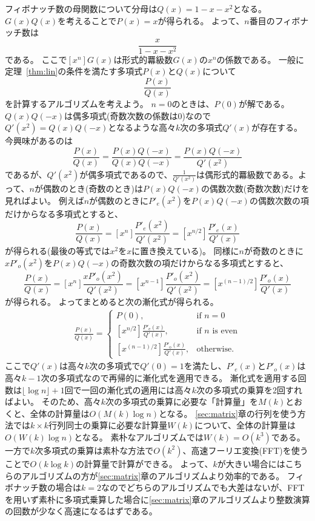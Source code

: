 \documentclass[a4paper,twoside,onecolumn,openany,article]{memoir}
\theoremstyle{plain}
\theoremstyle{remark}
\begin{document}
フィボナッチ数の母関数について分母は$Q(x)=1-x-x^2$となる。$G(x)Q(x)$を考えることで$P(x)=x$が得られる。
よって、$n$番目のフィボナッチ数は
\begin{equation*}
[x^n] \frac{x}{1-x-x^2}
\end{equation*}
である。
ここで$[x^n]G(x)$は形式的羃級数$G(x)$の$x^n$の係数である。
一般に定理~\ref{thm:lin}の条件を満たす多項式$P(x)$と$Q(x)$について
\begin{equation*}
[x^n]\frac{P(x)}{Q(x)}
\end{equation*}
を計算するアルゴリズムを考えよう。
$n=0$のときは、$P(0)$が解である。
$Q(x)Q(-x)$は偶多項式(奇数次数の係数は0)なので$Q'(x^2)=Q(x)Q(-x)$となるような高々$k$次の多項式$Q'(x)$が存在する。
今興味があるのは
\begin{equation*}
\frac{P(x)}{Q(x)} = \frac{P(x)Q(-x)}{Q(x)Q(-x)}
= \frac{P(x)Q(-x)}{Q'(x^2)}
\end{equation*}
であるが、$Q'(x^2)$が偶多項式であるので、$\frac1{Q'(x^2)}$は偶形式的羃級数である。よって、$n$が偶数のとき(奇数のとき)は$P(x)Q(-x)$の偶数次数(奇数次数)だけを見ればよい。
例えば$n$が偶数のときに$P'_e(x^2)$を$P(x)Q(-x)$の偶数次数の項だけからなる多項式とすると、
\begin{equation*}
[x^n]\frac{P(x)}{Q(x)} = [x^n]\frac{P'_e(x^2)}{Q'(x^2)}
= [x^{n/2}]\frac{P'_e(x)}{Q'(x)}
\end{equation*}
が得られる(最後の等式では$x^2$を$x$に置き換えている)。
同様に$n$が奇数のときに$xP'_o(x^2)$を$P(x)Q(-x)$の奇数次数の項だけからなる多項式とすると、
\begin{equation*}
[x^n]\frac{P(x)}{Q(x)} = [x^n]\frac{xP'_o(x^2)}{Q'(x^2)}
= [x^{n-1}]\frac{P'_o(x^2)}{Q'(x^2)} = [x^{(n-1)/2}]\frac{P'_o(x)}{Q'(x)}
\end{equation*}
が得られる。
よってまとめると次の漸化式が得られる。
\begin{align*}
[x^n]\frac{P(x)}{Q(x)}
=
\begin{cases}
P(0),&\text{if } n = 0\\
[x^{n/2}] \frac{P'_\mathrm{e}(x)}{Q'(x)},&\text{if $n$ is even}\\
[x^{(n-1)/2}] \frac{P'_\mathrm{o}(x)}{Q'(x)},&\text{otherwise.}
\end{cases}
\end{align*}
ここで$Q'(x)$は高々$k$次の多項式で$Q'(0)=1$を満たし、$P'_e(x)$と$P'_o(x)$は高々$k-1$次の多項式なので再帰的に漸化式を適用できる。
漸化式を適用する回数は$\lfloor \log n \rfloor + 1$回で一回の漸化式の適用には高々$k$次の多項式の乗算を2回すればよい。
そのため、高々$k$次の多項式の乗算に必要な「計算量」を$M(k)$とおくと、全体の計算量は$O(M(k)\log n)$となる。
\ref{sec:matrix}章の行列を使う方法では$k\times k$行列同士の乗算に必要な計算量$W(k)$について、全体の計算量は$O(W(k)\log n)$となる。
素朴なアルゴリズムでは$W(k)=O(k^3)$である。一方で$k$次多項式の乗算は素朴な方法で$O(k^2)$、高速フーリエ変換(FFT)を使うことで$O(k\log k)$の計算量で計算ができる。
よって、$k$が大きい場合にはこちらのアルゴリズムの方が\ref{sec:matrix}章のアルゴリズムより効率的である。
フィボナッチ数の場合は$k=2$なのでどちらのアルゴリズムでも大差はないが、FFTを用いず素朴に多項式乗算した場合に\ref{sec:matrix}章のアルゴリズムより整数演算の回数が少なく高速になるはずである。
\end{document}
